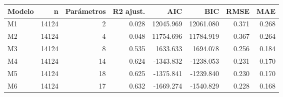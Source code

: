 \begin{tabular}{lrrrrrrr}
\toprule
Modelo & n & Parámetros & R2 ajust. & AIC & BIC & RMSE & MAE \\
\midrule
M1 & 14124 & 2 & 0.028 & 12045.969 & 12061.080 & 0.371 & 0.268 \\
M2 & 14124 & 4 & 0.048 & 11754.696 & 11784.919 & 0.367 & 0.264 \\
M3 & 14124 & 8 & 0.535 & 1633.633 & 1694.078 & 0.256 & 0.184 \\
M4 & 14124 & 14 & 0.624 & -1343.832 & -1238.053 & 0.231 & 0.170 \\
M5 & 14124 & 18 & 0.625 & -1375.841 & -1239.840 & 0.230 & 0.170 \\
M6 & 14124 & 17 & 0.632 & -1669.274 & -1540.829 & 0.228 & 0.168 \\
\bottomrule
\end{tabular}
